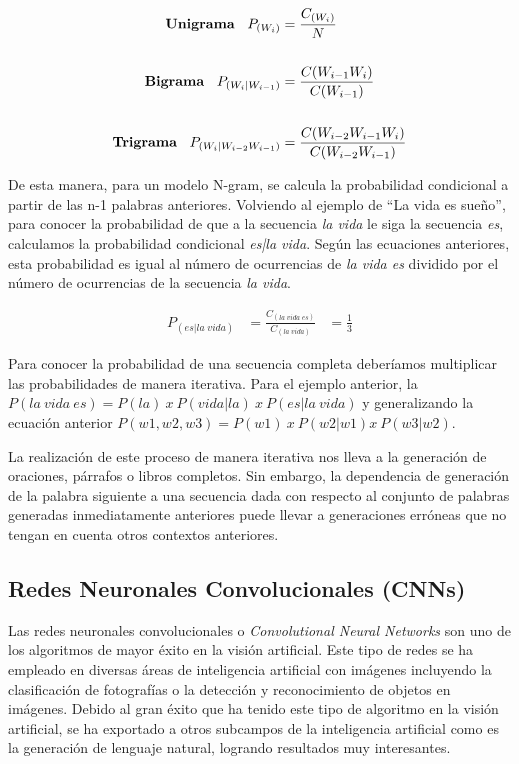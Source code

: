 \begin{equation}
	\label{eq:probabilidadesngram}
	\begin{aligned}
		\textrm{\textbf{Unigrama}}\:\:\:\:
		P_{(W_i)} & = \frac{C_{(W_i)}}{N}   \\     
		\\
		\textrm{\textbf{Bigrama}}\:\:\:\:
		P_{(W_i|W_{i-1})} & = \frac{C(W_{i-1}W_i)}{C({W_{i-1}})}\\
		\\
		\textrm{\textbf{Trigrama}}\:\:\:\:
		P_{(W_i|W_{i-2}W_{i-1})} & = \frac{C(W_{i-2}W_{i-1}W_i)}{C({W_{i-2}W_{i-1}})}
	\end{aligned}
\end{equation}

De esta manera, para un modelo N-gram, se calcula la probabilidad condicional a partir de las n-1 palabras anteriores. Volviendo al ejemplo de ``La vida es sueño'', para conocer la probabilidad de que a la secuencia \textit{la vida} le siga la secuencia \textit{es}, calculamos la probabilidad condicional \textit{es|la vida}. Según las ecuaciones anteriores, esta probabilidad es igual al número de ocurrencias de \textit{la vida es} dividido por el número de ocurrencias de la secuencia \textit{la vida}.

\begin{equation}
	\label{eq:probabilidadesngram_ejemplo}
	\begin{aligned}
		P_{(es|la\;vida)} & = \frac{C_{(la\;vida\;es)}}{C_{(la\;vida)}}  &= \frac{1}{3}
	\end{aligned}
\end{equation}

Para conocer la probabilidad de una secuencia completa deberíamos multiplicar las probabilidades de manera iterativa. Para el ejemplo anterior, la $P(la\:vida\:es)= P(la)\:x\:P(vida|la)\:x\:P(es|la\:vida)$ y generalizando la ecuación anterior  $P(w1, w2, w3)= P(w1)\:x\:P(w2|w1)x\:P(w3|w2)$.

La realización de este proceso de manera iterativa nos lleva a la generación de oraciones, párrafos o libros completos. Sin embargo, la dependencia de generación de la palabra siguiente a una secuencia dada con respecto al conjunto de palabras generadas inmediatamente anteriores puede llevar a generaciones erróneas que no tengan en cuenta otros contextos anteriores.


\subsection{Redes Neuronales Convolucionales (CNNs)}
\label{sec:cnn}
Las redes neuronales convolucionales o \textit{Convolutional Neural Networks} son uno de los algoritmos de mayor éxito en la visión artificial. Este tipo de redes se ha empleado en diversas áreas de inteligencia artificial con imágenes incluyendo la clasificación de fotografías o la detección y reconocimiento de objetos en imágenes. Debido al gran éxito que ha tenido este tipo de algoritmo en la visión artificial, se ha exportado a otros subcampos de la inteligencia artificial como es la generación de lenguaje natural, logrando resultados muy interesantes. 


